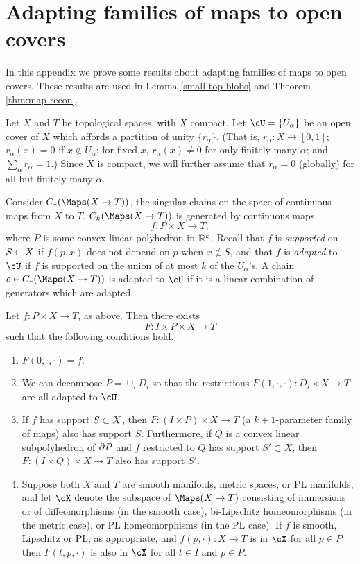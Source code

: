 
\section{Adapting families of maps to open covers}  \label{sec:localising}

In this appendix we prove some results about adapting families of maps to open covers.
These results are used in Lemma \ref{small-top-blobs} and Theorem \ref{thm:map-recon}.

Let $X$ and $T$ be topological spaces, with $X$ compact.
Let $\cU = \{U_\alpha\}$ be an open cover of $X$ which affords a partition of
unity $\{r_\alpha\}$.
(That is, $r_\alpha : X \to [0,1]$; $r_\alpha(x) = 0$ if $x\notin U_\alpha$;
for fixed $x$, $r_\alpha(x) \ne 0$ for only finitely many $\alpha$; and $\sum_\alpha r_\alpha = 1$.)
Since $X$ is compact, we will further assume that $r_\alpha = 0$ (globally) 
for all but finitely many $\alpha$.

Consider  $C_*(\Maps(X\to T))$, the singular chains on the space of continuous maps from $X$ to $T$.
$C_k(\Maps(X \to T))$ is generated by continuous maps
\[
	f: P\times X \to T ,
\]
where $P$ is some convex linear polyhedron in $\mathbb{R}^k$.
Recall that $f$ is {\it supported} on $S\subset X$ if $f(p, x)$ does not depend on $p$ when
$x \notin S$, and that $f$ is {\it adapted} to $\cU$ if 
$f$ is supported on the union of at most $k$ of the $U_\alpha$'s.
A chain $c \in C_*(\Maps(X \to T))$ is adapted to $\cU$ if it is a linear combination of 
generators which are adapted.

\begin{lemma} \label{basic_adaptation_lemma}
Let $f: P\times X \to T$, as above.
Then there exists
\[
	F: I \times P\times X \to T
\]
such that the following conditions hold.
\begin{enumerate}
\item $F(0, \cdot, \cdot) = f$.
\item We can decompose $P = \cup_i D_i$ so that
the restrictions $F(1, \cdot, \cdot) : D_i\times X\to T$ are all adapted to $\cU$.
\item If $f$ has support $S\subset X$, then
$F: (I\times P)\times X\to T$ (a $k{+}1$-parameter family of maps) also has support $S$.
Furthermore, if $Q$ is a convex linear subpolyhedron of $\partial P$ and $f$ restricted to $Q$
has support $S' \subset X$, then
$F: (I\times Q)\times X\to T$ also has support $S'$.
\item Suppose both $X$ and $T$ are smooth manifolds, metric spaces, or PL manifolds, and 
let $\cX$ denote the subspace of $\Maps(X \to T)$ consisting of immersions or of diffeomorphisms (in the smooth case), 
bi-Lipschitz homeomorphisms (in the metric case), or PL homeomorphisms (in the PL case).
 If $f$ is smooth, Lipschitz or PL, as appropriate, and $f(p, \cdot):X\to T$ is in $\cX$ for all $p \in P$
then $F(t, p, \cdot)$ is also in $\cX$ for all $t\in I$ and $p\in P$.
\end{enumerate}
\end{lemma}

